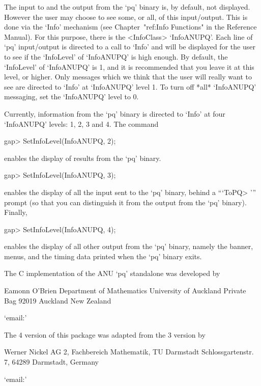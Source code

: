 The input to and the output from the `pq'  binary  is,  by  default,  not
displayed. However the user may choose to  see  some,  or  all,  of  this
input/output.   This   is   done   via   the   `Info'   mechanism    (see
Chapter~"ref:Info Functions" in the {\GAP} Reference  Manual).  For  this
purpose,  there  is  the  <InfoClass>  `InfoANUPQ'.  Each  line  of  `pq'
input/output is directed to a call to `Info' and will  be  displayed  for
the user to see if the `InfoLevel' of  `InfoANUPQ'  is  high  enough.  By
default, the `InfoLevel' of `InfoANUPQ' is 1, and it is recommended  that
you leave it at this level, or higher. Only messages which we think  that
the user will really want to see are directed to  `Info'  at  `InfoANUPQ'
level 1. To turn off *all* `InfoANUPQ'  messaging,  set  the  `InfoANUPQ'
level to 0.

Currently, information from the `pq' binary is directed to `Info' at four
`InfoANUPQ' levels: 1, 2, 3 and 4. The command

\beginexample
gap> SetInfoLevel(InfoANUPQ, 2);
\endexample

enables the display of results from the `pq'  binary.

\beginexample
gap> SetInfoLevel(InfoANUPQ, 3);
\endexample

enables the display of all the input sent to the `pq'  binary,  behind  a
```ToPQ> ''' prompt (so that you can distinguish it from the output  from
the `pq' binary). Finally,

\beginexample
gap> SetInfoLevel(InfoANUPQ, 4);
\endexample

enables the display of all other output from the `pq' binary, namely  the
banner, menus, and the timing data printed when the `pq' binary exits.


The C implementation of the ANU `pq' standalone was developed by

\begintt
Eamonn O'Brien
Department of Mathematics
University of Auckland
Private Bag 92019
Auckland
New Zealand
\endtt

{}`email:' 

The {\GAP} 4 version of this package was adapted from the {\GAP} 3
version by  

\begintt
Werner Nickel
AG 2, Fachbereich Mathematik, TU Darmstadt
Schlossgartenstr. 7, 64289 Darmstadt, Germany
\endtt

{}`email:' 

